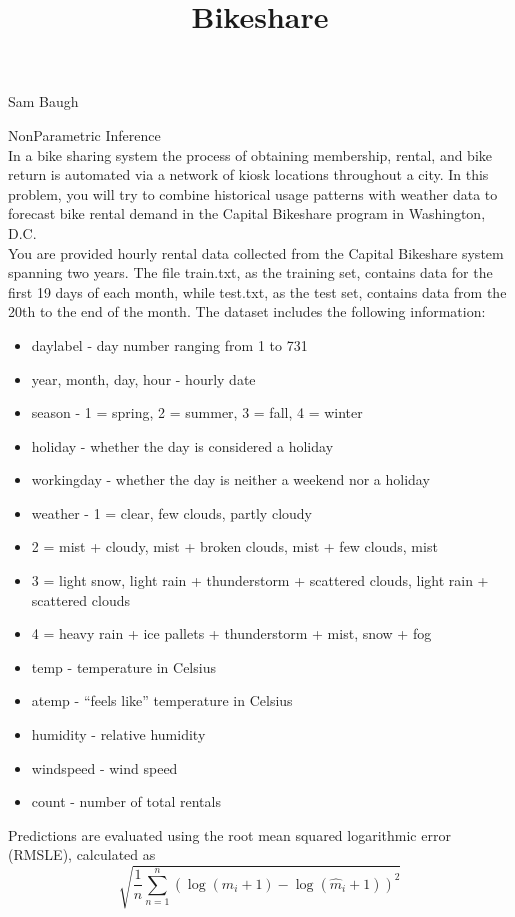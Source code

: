 \documentclass[12pt]{article}
\title{Bikeshare}
\begin{document}
Sam Baugh

NonParametric Inference \\

In a bike sharing system the process of obtaining membership, rental, and bike return is
automated via a network of kiosk locations throughout a city. In this problem, you will try
to combine historical usage patterns with weather data to forecast bike rental demand in the
Capital Bikeshare program in Washington, D.C.\\


You are provided hourly rental data collected from the Capital Bikeshare system spanning
two years. The file train.txt, as the training set, contains data for the first 19 days of
each month, while test.txt, as the test set, contains data from the 20th to the end of the
month. The dataset includes the following information:\\

\begin{itemize}
\item daylabel - day number ranging from 1 to 731 
\item year, month, day, hour - hourly date
\item season - 1 = spring, 2 = summer, 3 = fall, 4 = winter
\item holiday - whether the day is considered a holiday
\item workingday - whether the day is neither a weekend nor a holiday 
\item weather - 1 = clear, few clouds, partly cloudy 
\item 2 = mist + cloudy, mist + broken clouds, mist + few clouds, mist 
\item 3 = light snow, light rain + thunderstorm + scattered clouds, light rain + scattered clouds 
\item 4 = heavy rain + ice pallets + thunderstorm + mist, snow + fog 
\item temp - temperature in Celsius 
\item atemp - “feels like”  temperature in Celsius 
\item humidity - relative humidity
\item windspeed - wind speed
\item count - number of total rentals
\end{itemize}

Predictions are evaluated using the root mean squared logarithmic error (RMSLE), calculated
as $$\sqrt{\frac{1}{n}\sum_{n=1}^n(\log(m_i+1)-\log(\hat{m}_i+1))^2}$$
\end{document}
